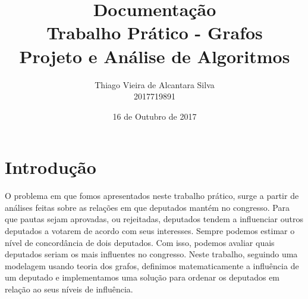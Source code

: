 \documentclass[10pt]{article}
\title{\textbf{Documentação\\Trabalho Prático - Grafos}\\Projeto e Análise de Algoritmos}
\author{Thiago Vieira de Alcantara Silva\\2017719891}
\date{16 de Outubro de 2017}
\begin{document}
\maketitle

\section{Introdução}

O problema em que fomos apresentados neste trabalho prático, surge a partir de análises feitas sobre as relações em que deputados mantém no congresso.
Para que pautas sejam aprovadas, ou rejeitadas, deputados tendem a influenciar outros deputados a votarem de acordo com seus interesses.
Sempre podemos estimar o nível de concordância de dois deputados. Com isso, podemos avaliar quais deputados seriam os mais influentes no congresso.
Neste trabalho, seguindo uma modelagem usando teoria dos grafos, definimos matematicamente a influência de um deputado e implementamos uma solução para ordenar os deputados em relação ao seus níveis de influência.
\end{document}
